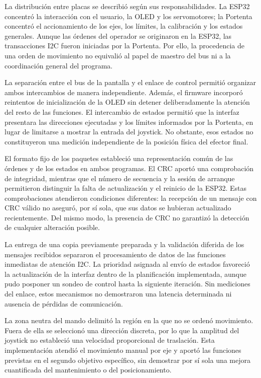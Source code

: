 La distribución entre placas se describió según sus responsabilidades. La ESP32 concentró la interacción con el usuario, la OLED y los servomotores; la Portenta concentró el accionamiento de los ejes, los límites, la calibración y los estados generales. Aunque las órdenes del operador se originaron en la ESP32, las transacciones I2C fueron iniciadas por la Portenta. Por ello, la procedencia de una orden de movimiento no equivalió al papel de maestro del bus ni a la coordinación general del programa.

La separación entre el bus de la pantalla y el enlace de control permitió organizar ambos intercambios de manera independiente. Además, el firmware incorporó reintentos de inicialización de la OLED sin detener deliberadamente la atención del resto de las funciones. El intercambio de estados permitió que la interfaz presentara las direcciones ejecutadas y los límites informados por la Portenta, en lugar de limitarse a mostrar la entrada del joystick. No obstante, esos estados no constituyeron una medición independiente de la posición física del efector final.

El formato fijo de los paquetes estableció una representación común de las órdenes y de los estados en ambos programas. El CRC aportó una comprobación de integridad, mientras que el número de secuencia y la sesión de arranque permitieron distinguir la falta de actualización y el reinicio de la ESP32. Estas comprobaciones atendieron condiciones diferentes: la recepción de un mensaje con CRC válido no aseguró, por sí sola, que sus datos se hubieran actualizado recientemente. Del mismo modo, la presencia de CRC no garantizó la detección de cualquier alteración posible.

La entrega de una copia previamente preparada y la validación diferida de los mensajes recibidos separaron el procesamiento de datos de las funciones inmediatas de atención I2C. La prioridad asignada al envío de estados favoreció la actualización de la interfaz dentro de la planificación implementada, aunque pudo posponer un sondeo de control hasta la siguiente iteración. Sin mediciones del enlace, estos mecanismos no demostraron una latencia determinada ni ausencia de pérdidas de comunicación.

La zona neutra del mando delimitó la región en la que no se ordenó movimiento. Fuera de ella se seleccionó una dirección discreta, por lo que la amplitud del joystick no estableció una velocidad proporcional de traslación. Esta implementación atendió el movimiento manual por eje y aportó las funciones previstas en el segundo objetivo específico, sin demostrar por sí sola una mejora cuantificada del mantenimiento o del posicionamiento.

